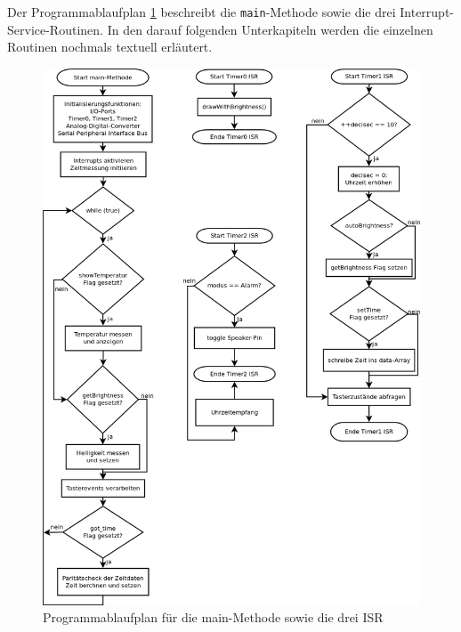 Der Programmablaufplan \ref{fig_pap} beschreibt die \texttt{main}-Methode sowie die drei Interrupt-Service-Routinen. In den darauf folgenden Unterkapiteln werden die einzelnen Routinen nochmals textuell erläutert.
\begin{figure}[htp]
\centering
\includegraphics[width=\textwidth]{skizzen/papTimerAndMain.png}
\caption{Programmablaufplan für die main-Methode sowie die drei ISR}\label{fig_pap}
\end{figure}
%
